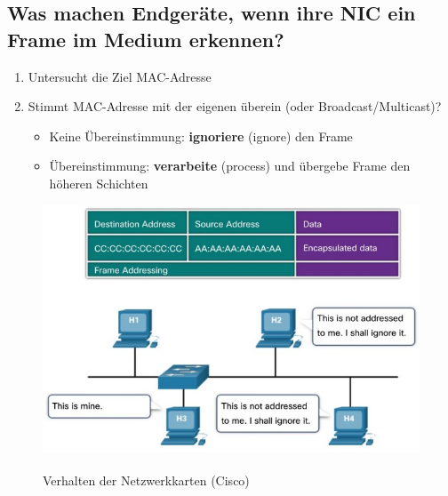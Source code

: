 \subsection*{Was machen Endgeräte, wenn ihre NIC ein Frame im Medium erkennen?}\label{sub:Frameerkennung}
\begin{enumerate}
    \item Untersucht die Ziel MAC-Adresse
    \item Stimmt MAC-Adresse mit der eigenen überein (oder Broadcast/Multicast)?
    \begin{itemize}
        \item Keine Übereinstimmung: \textbf{ignoriere} (ignore) den Frame
        \item Übereinstimmung: \textbf{verarbeite} (process) und übergebe Frame den höheren Schichten
    \end{itemize}
\end{enumerate}

\begin{figure}[H]
    \begin{center}
    \label{pic:EthernetFrameProcessing}
    \includegraphics[width=\textwidth]{images/Frame_processing.jpg}
    \caption{Verhalten der Netzwerkkarten (\textsuperscript{\textcopyright}Cisco)}
    \end{center}
\end{figure}

